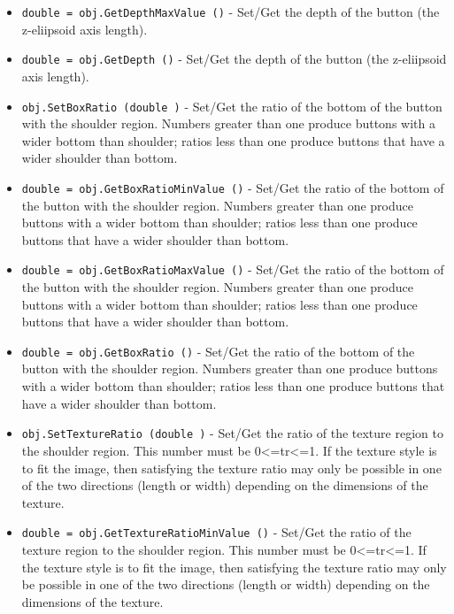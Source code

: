 \begin{itemize}
\item  \verb|double = obj.GetDepthMaxValue ()| -  Set/Get the depth of the button (the z-eliipsoid axis length).

\item  \verb|double = obj.GetDepth ()| -  Set/Get the depth of the button (the z-eliipsoid axis length).

\item  \verb|obj.SetBoxRatio (double )| -  Set/Get the ratio of the bottom of the button with the
 shoulder region. Numbers greater than one produce buttons
 with a wider bottom than shoulder; ratios less than one
 produce buttons that have a wider shoulder than bottom.

\item  \verb|double = obj.GetBoxRatioMinValue ()| -  Set/Get the ratio of the bottom of the button with the
 shoulder region. Numbers greater than one produce buttons
 with a wider bottom than shoulder; ratios less than one
 produce buttons that have a wider shoulder than bottom.

\item  \verb|double = obj.GetBoxRatioMaxValue ()| -  Set/Get the ratio of the bottom of the button with the
 shoulder region. Numbers greater than one produce buttons
 with a wider bottom than shoulder; ratios less than one
 produce buttons that have a wider shoulder than bottom.

\item  \verb|double = obj.GetBoxRatio ()| -  Set/Get the ratio of the bottom of the button with the
 shoulder region. Numbers greater than one produce buttons
 with a wider bottom than shoulder; ratios less than one
 produce buttons that have a wider shoulder than bottom.

\item  \verb|obj.SetTextureRatio (double )| -  Set/Get the ratio of the texture region to the
 shoulder region. This number must be 0<=tr<=1.
 If the texture style is to fit the image, then satisfying
 the texture ratio may only be possible in one of the
 two directions (length or width) depending on the 
 dimensions of the texture.

\item  \verb|double = obj.GetTextureRatioMinValue ()| -  Set/Get the ratio of the texture region to the
 shoulder region. This number must be 0<=tr<=1.
 If the texture style is to fit the image, then satisfying
 the texture ratio may only be possible in one of the
 two directions (length or width) depending on the 
 dimensions of the texture.


\end{itemize}
